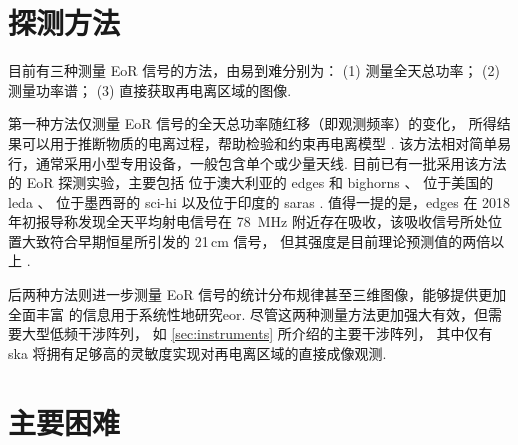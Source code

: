 \section{探测方法}
\label{sec:det-methods}

目前有三种测量 EoR 信号的方法，由易到难分别为：
(1) 测量全天总功率；
(2) 测量功率谱；
(3) 直接获取再电离区域的图像.

第一种方法仅测量 EoR 信号的全天总功率随红移（即观测频率）的变化，
所得结果可以用于推断物质的电离过程，帮助检验和约束再电离模型
\cite{pritchard2012,liu2016}.
该方法相对简单易行，通常采用小型专用设备，一般包含单个或少量天线.
目前已有一批采用该方法的 EoR 探测实验，主要包括
位于澳大利亚的 \ac{edges} \cite{bowman2008} 和
\ac{bighorns} \cite{sokolowski2015}、
位于美国的 \ac{leda} \cite{greenhill2012}、
位于墨西哥的 \ac{sci-hi} \cite{voytek2014}
以及位于印度的 \ac{saras} \cite{singh2018}.
值得一提的是，\acs{edges} 在 2018 年初报导称发现全天平均射电信号在 \SI{78}{\MHz}
附近存在吸收，该吸收信号所处位置大致符合早期恒星所引发的 21\,cm 信号，
但其强度是目前理论预测值的两倍以上 \cite{bowman2018}.

后两种方法则进一步测量 EoR 信号的统计分布规律甚至三维图像，能够提供更加全面丰富
的信息用于系统性地研究\acl{eor}.
尽管这两种测量方法更加强大有效，但需要大型低频干涉阵列，
如 \autoref{sec:instruments} 所介绍的主要干涉阵列，
其中仅有 \acs{ska} 将拥有足够高的灵敏度实现对再电离区域的直接成像观测.


\section{主要困难}
\label{sec:det-difficulties}

